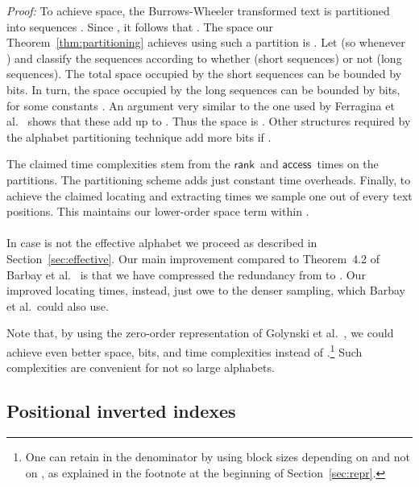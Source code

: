\documentclass[11pt]{article}
\newenvironment{proof}{\textit{Proof:}}{\hfill \paragraph{} }
\newcommand{\access}
    {\ensuremath{\mathsf{access}}}
\newcommand{\rank}
    {\ensuremath{\mathsf{rank}}}
\begin{document}
\begin{table}[t]
{\begin{tabular}
\begin{proof}
To achieve  space, the Burrows-Wheeler transformed text  is 
partitioned into  sequences  \cite{FMMN07}. 
Since , it follows that . The space our Theorem~\ref{thm:partitioning} achieves using 
such a partition is 
.
Let  (so  whenever ) and 
classify the sequences  according to whether  (short 
sequences) or not (long sequences). The total space occupied by the short 
sequences can be bounded by  bits. In turn, the space occupied by the
long sequences can be bounded by
 bits, for some constants . An argument very
similar to the one used by Ferragina et al.~\cite[Thm.~4.2]{FMMN07} shows
that these add up to 
. Thus the space
is . Other structures required by the alphabet
partitioning technique \cite{FMMN07} add  more bits if .

The claimed time complexities stem from the
\rank\ and \access\ times on the partitions.
The partitioning scheme \cite{FMMN07} adds
just constant time overheads. Finally, to achieve the claimed locating and 
extracting times we sample one out of every  text positions.
This maintains our lower-order space term  within 
. 
\end{proof}

In case  is not the effective alphabet we proceed as described 
in Section~\ref{sec:effective}.
Our main improvement compared to Theorem~4.2 of Barbay et al.~\cite{BHMR07}
is that we have compressed the redundancy from  to 
. Our improved locating times, instead, just owe to the denser
sampling, which Barbay et al.\ could also use.

Note that, by using the zero-order representation of Golynski et
al.~\cite[Thm.~4]{GRR08}, we
could achieve even better space,  bits, and time complexities
 instead of .\footnote{One can retain  
in the denominator by using block sizes depending on  and not on , 
as explained in the footnote at the beginning of Section~\ref{sec:repr}.}
Such complexities are convenient for not so large alphabets.



\subsection{Positional inverted indexes}


\end{tabular}}
\end{table}
\end{document}
